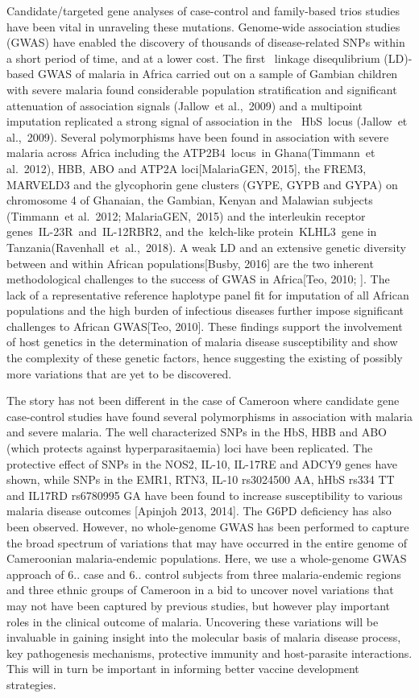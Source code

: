 \documentclass[a4paper,12pts]{report}
\begin{document}
Candidate/targeted gene analyses of case-control and family-based trios studies have been vital in unraveling these mutations. Genome-wide association studies (GWAS) have enabled the discovery of thousands of disease-related SNPs within a short period of time, and at a lower cost. The first  linkage disequlibrium (LD)-based GWAS of malaria in Africa carried out on a sample of Gambian children with severe malaria found considerable population stratification and significant attenuation of association signals (Jallow et al., 2009) and a multipoint imputation replicated a strong signal of association in the  HbS locus (Jallow et al., 2009). Several polymorphisms have been found in association with severe malaria across Africa including the ATP2B4 locus in Ghana(Timmann et al. 2012), HBB, ABO and ATP2A loci[MalariaGEN, 2015], the FREM3, MARVELD3 and the glycophorin gene clusters (GYPE, GYPB and GYPA) on chromosome 4 of Ghanaian, the Gambian, Kenyan and Malawian subjects  (Timmann et al. 2012; MalariaGEN, 2015) and the interleukin receptor genes IL-23R and IL-12RBR2, and the kelch-like protein KLHL3 gene in Tanzania(Ravenhall et al., 2018). A weak LD and an extensive genetic diversity between and within African populations[Busby, 2016] are the two inherent methodological challenges to the success of GWAS in Africa[Teo, 2010; ]. The lack of a representative reference haplotype panel fit for imputation of all African populations and the high burden of infectious diseases further impose significant challenges to African GWAS[Teo, 2010]. These findings support the involvement of host genetics in the determination of malaria disease susceptibility and show the complexity of these genetic factors, hence suggesting the existing of possibly more variations that are yet to be discovered.

The story has not been different in the case of Cameroon where candidate gene case-control studies have found several polymorphisms in association with malaria and severe malaria. The well characterized SNPs in the HbS, HBB and ABO (which protects against hyperparasitaemia) loci have been replicated. The protective effect of SNPs in the NOS2, IL-10, IL-17RE and ADCY9 genes have shown, while SNPs in the EMR1, RTN3, IL-10 rs3024500 AA, hHbS rs334 TT and IL17RD rs6780995 GA have been found to increase susceptibility to various malaria disease outcomes [Apinjoh 2013, 2014]. The G6PD deficiency has also been observed. However, no whole-genome GWAS has been performed to capture the broad spectrum of variations that may have occurred  in the entire genome of Cameroonian malaria-endemic populations. Here, we use a whole-genome GWAS approach of 6.. case and 6.. control subjects from three malaria-endemic regions and three ethnic groups of Cameroon in a bid to uncover novel variations that may not have been captured by previous studies, but however play important roles in the clinical outcome of malaria. Uncovering these variations will be invaluable in gaining insight into the molecular basis of malaria disease process, key pathogenesis mechanisms, protective immunity and host-parasite interactions. This will in turn be important in informing better vaccine development strategies.
\end{document}
